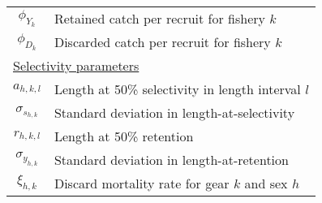 \documentclass[12pt,letterpaper]{article}
\begin{document}
\begin{table}
\begin{tabular}{cl}
      $\phi_{Y_k}$& Retained catch per recruit for fishery $k$ \\
      $\phi_{D_k}$& Discarded catch per recruit for fishery $k$ \\
  \multicolumn{2}{l}{\underline{Selectivity parameters}} \\
      $a_{h,k,l}$ & Length at 50\% selectivity in length interval $l$\\
      $\sigma_{s_{h,k}}$ & Standard deviation in length-at-selectivity\\
      $r_{h,k,l}$ & Length at 50\% retention\\
      $\sigma_{y_{h,k}}$ & Standard deviation in length-at-retention\\
      $\xi_{h,k}$ & Discard mortality rate for gear $k$ and sex $h$\\
  \hline
  \end{tabular}
\end{table}


  


  


  
  
\end{document}
